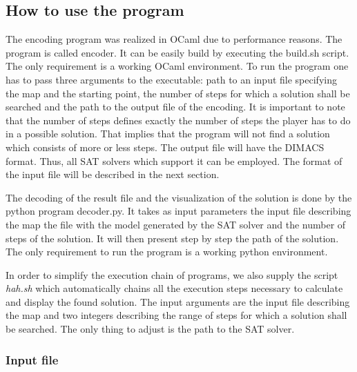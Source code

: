 \documentclass[a4paper, 12pt, titlepage]{article}
\begin{document}
\subsection{How to use the program}

The encoding program was realized in OCaml due to performance reasons. 
The program is called encoder. 
It can be easily build by executing the build.sh script. 
The only requirement is a working OCaml environment. 
To run the program one has to pass three arguments to the executable: path to an input file specifying the map and the starting point, the number of steps for which a solution shall be searched and the path to the output file of the encoding. 
It is important to note that the number of steps defines exactly the number of steps the player has to do in a possible solution. 
That implies that the program will not find a solution which consists of more or less steps. 
The output file will have the DIMACS format. 
Thus, all SAT solvers which support it can be employed. 
The format of the input file will be described in the next section.

The decoding of the result file and the visualization of the solution is done by the python program decoder.py. 
It takes as input parameters the input file describing the map the file with the model generated by the SAT solver and the number of steps of the solution. 
It will then present step by step the path of the solution. 
The only requirement to run the program is a working python environment. 

In order to simplify the execution chain of programs, we also supply the script \emph{hah.sh} which automatically chains all the execution steps necessary to calculate and display the found solution. The input arguments are the input file describing the map and two integers describing the range of steps for which a solution shall be searched. The only thing to adjust is the path to the SAT solver.

\subsubsection{Input file}
\end{document}
